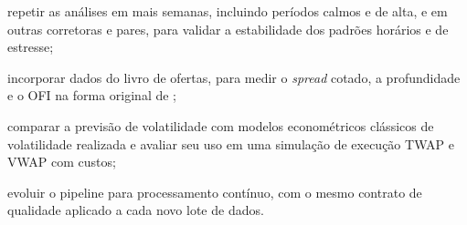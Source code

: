 \begin{alineas}
  \item repetir as análises em mais semanas, incluindo períodos calmos e de alta,
        e em outras corretoras e pares, para validar a estabilidade dos padrões
        horários e de estresse;
  \item incorporar dados do livro de ofertas, para medir o \textit{spread}
        cotado, a profundidade e o OFI na forma original de
        ;
  \item comparar a previsão de volatilidade com modelos econométricos clássicos
        de volatilidade realizada e avaliar seu uso em uma simulação de execução
        TWAP e VWAP com custos;
  \item evoluir o pipeline para processamento contínuo, com o mesmo contrato de
        qualidade aplicado a cada novo lote de dados.
\end{alineas}
